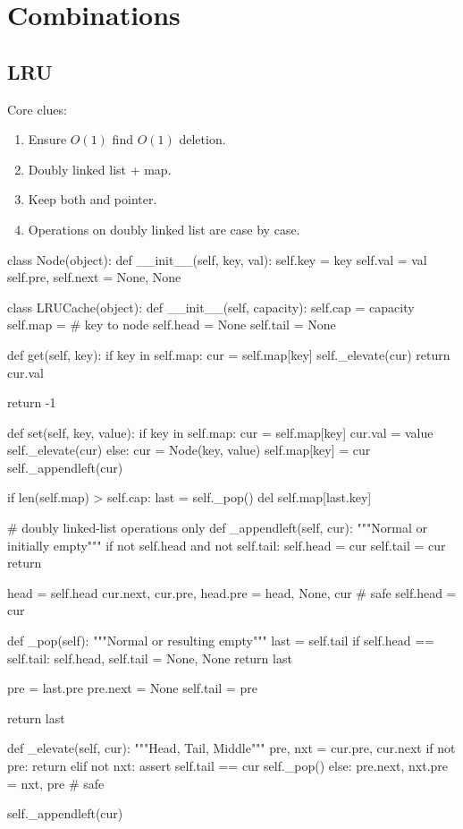 \section{Combinations}
\subsection{LRU}
Core clues:
\begin{enumerate}
\item Ensure $O(1)$ find $O(1)$ deletion. 
\item Doubly linked list + map.
\item Keep both  and  pointer.
\item Operations on doubly linked list are case by case.  
\end{enumerate}
\begin{python}
class Node(object):
    def __init__(self, key, val):
        self.key = key
        self.val = val
        self.pre, self.next = None, None


class LRUCache(object):
    def __init__(self, capacity):
        self.cap = capacity
        self.map = {}  # key to node
        self.head = None
        self.tail = None

    def get(self, key):
        if key in self.map:
            cur = self.map[key]
            self._elevate(cur)
            return cur.val

        return -1

    def set(self, key, value):
        if key in self.map:
            cur = self.map[key]
            cur.val = value
            self._elevate(cur)
        else:
            cur = Node(key, value)
            self.map[key] = cur
            self._appendleft(cur)

            if len(self.map) > self.cap:
                last = self._pop()
                del self.map[last.key]

    # doubly linked-list operations only
    def _appendleft(self, cur):
        """Normal or initially empty"""
        if not self.head and not self.tail:
            self.head = cur
            self.tail = cur
            return

        head = self.head
        cur.next, cur.pre, head.pre = head, None, cur  # safe
        self.head = cur

    def _pop(self):
        """Normal or resulting empty"""
        last = self.tail
        if self.head == self.tail:
            self.head, self.tail = None, None
            return last

        pre = last.pre
        pre.next = None
        self.tail = pre
        
        return last

    def _elevate(self, cur):
        """Head, Tail, Middle"""
        pre, nxt = cur.pre, cur.next
        if not pre:
            return
        elif not nxt:
            assert self.tail == cur
            self._pop()
        else:
            pre.next, nxt.pre = nxt, pre  # safe

        self._appendleft(cur)
\end{python}

